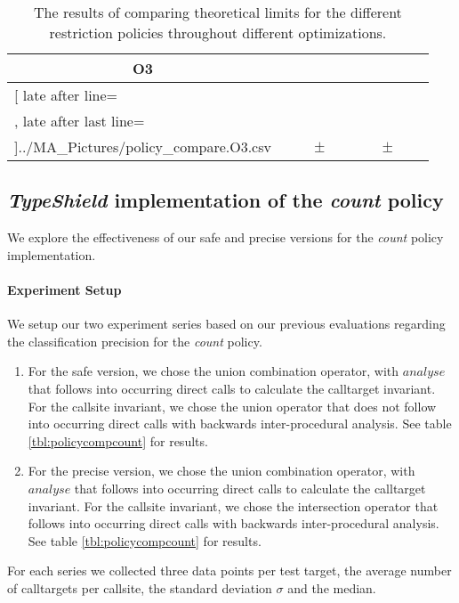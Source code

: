 \begin{table}[!htbp]
{\begin{tabular}{l|c|rcl|c|rcl|c}
\multicolumn{1}{c}{\bfseries O3}
	\\\midrule
	\csvreader[ late after line=\\, late after last line=\\\bottomrule]{../MA_Pictures/policy_compare.O3.csv}{
}
	{\csvcolii  &  \csvcoliii & \csvcolx & $\pm$ & \csvcolxi & \csvcolxii & \csvcolxix & $\pm$ & \csvcolxx& \csvcolxxi}%

    	\end{tabular}
}
		\caption {The results of comparing theoretical limits for the different restriction policies throughout different optimizations.}
		\label{tbl:policycomp}
\end{table}

\newpage
\subsection{\textit{TypeShield} implementation of the \textit{count} policy}
\label{subsection:typeshieldvslimitcount}
We explore the effectiveness of our safe and precise versions for the \textit{count} policy implementation.

\paragraph{Experiment Setup} We setup our two experiment series based on our previous evaluations regarding the classification precision for the \textit{count} policy.
\begin{enumerate}
\item For the safe version, we chose the union combination operator, with $analyse$ that follows into occurring direct calls to 
calculate the calltarget invariant. For the callsite invariant, we chose the union operator that does not follow into occurring direct calls with backwards inter-procedural analysis.  See table \ref{tbl:policycompcount} for results. 
\item For the precise version, we chose the union combination operator, with $analyse$ that follows into occurring direct calls to calculate the calltarget invariant. For the callsite invariant, we chose the intersection operator that follows into occurring direct calls with backwards inter-procedural analysis. See table \ref{tbl:policycompcount} for results. 
\end{enumerate}
For each series we collected three data points per test target, the average number of calltargets per callsite, the standard deviation $\sigma$ and the median.

